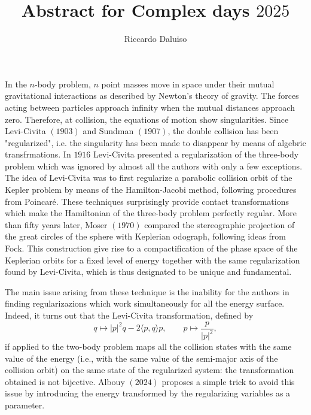 \documentclass{article}
\title{Abstract for Complex days $2025$}
\author{Riccardo Daluiso}
\begin{document}
\maketitle

\section*{}

In the $n$-body problem, $n$ point masses move in space under their mutual gravitational interactions as described by Newton’s theory of gravity. The forces acting between particles approach infinity when the mutual distances approach zero. Therefore, at collision, the equations of motion show singularities. Since Levi-Civita $(1903)$ and Sundman $(1907)$, the double collision has been "regularized", i.e. the singularity has been made to disappear by means of algebric transfrmations. In $1916$ Levi-Civita presented a regularization of the three-body problem which was ignored by almost all the authors with only a few exceptions. The idea of Levi-Civita was to first regularize a parabolic collision orbit of the Kepler problem by means of the Hamilton-Jacobi method, following procedures from Poincaré. These techniques surprisingly provide contact transformations which make the Hamiltonian of the three-body problem perfectly regular. 
More than fifty years later, Moser $(1970)$ compared the stereographic projection of the great circles of the sphere with Keplerian odograph, following ideas from Fock. This construction give rise to a compactification of the phase space of the Keplerian orbits for a fixed level of energy together with the same regularization found by Levi-Civita, which is thus designated to be unique and fundamental. 
\par The main issue arising from these technique is the inability for the authors in finding regularizazions which work simultaneously for all the energy surface. Indeed, it turns out that the Levi-Civita transformation, defined by
\[
q \mapsto |p|^2q - 2 \langle  p , q \rangle p, \qquad p \mapsto \frac{p}{|p|^2},
\]
 if applied to the two-body problem maps all the collision states with the same value of the energy (i.e., with the same value of the semi-major axis of the collision orbit) on the same state of the regularized system: the transformation obtained is not bijective. Albouy $(2024)$ proposes a simple trick to avoid this issue by introducing the energy transformed by the regularizing variables as a parameter. 
\end{document}
